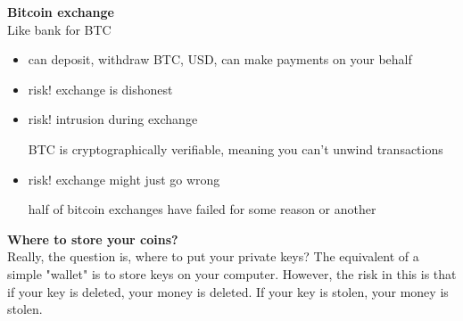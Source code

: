 \textbf{Bitcoin exchange}\\
Like bank for BTC
\begin{itemize}
	\item can deposit, withdraw BTC, USD, can make payments on your behalf
	\item risk! exchange is dishonest
	\item risk! intrusion during exchange

		BTC is cryptographically verifiable, meaning you can't unwind transactions
	\item risk! exchange might just go wrong

		half of bitcoin exchanges have failed for some reason or another
\end{itemize}


\textbf{Where to store your coins?}\\
Really, the question is, where to put your private keys?
The equivalent of a simple "wallet" is to store keys on your computer. However, the risk in this is that if your key is deleted, your money is deleted. If your key is stolen, your money is stolen.

